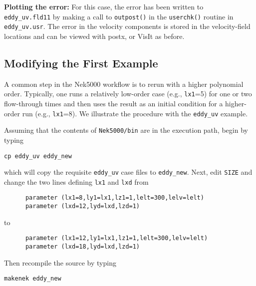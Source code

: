 {\bf Plotting the error:}
For this case, the error has been written to {\tt
eddy\_uv.fld11} by making a call to {\tt outpost()} in the {\tt userchk()}
routine in {\tt eddy\_uv.usr}.  The error in the velocity components
is stored in the velocity-field locations and can be viewed with 
postx, or VisIt as before.

\begin{comment}
through the following sequence: 
\begin{tabular}{r l l l}
  & {\bf click} \hspace*{1in} &{\bf type} \hspace*{1in} & {\bf comment} \\ \hline
1.& SET TIME         & 11 & load fld11 \\
2.& SET QUANTITY \\
3.& VELOCITY \\
4.& MAGNITUDE \\
5.& PLOT  \\
\end{tabular}
\end{comment}

\subsection{Modifying the First Example}

A common step in the Nek5000 workflow is to rerun with a higher
polynomial order.   Typically, one runs a relatively low-order case
(e.g., {\tt lx1}=5) for one or two flow-through times and then uses
the result as an initial condition for a higher-order run
(e.g., {\tt lx1}=8).  We illustrate the procedure with the 
{\tt eddy\_uv} example.

Assuming that the contents of {\tt Nek5000/bin}
are in the execution path, begin by typing
\begin{verbatim}
cp eddy_uv eddy_new
\end{verbatim}
which will copy the requisite {\tt eddy\_uv} case files
to {\tt eddy\_new}.  
Next, edit {\tt SIZE} and change the two lines defining
{\tt lx1} and {\tt lxd} from
\begin{verbatim}
      parameter (lx1=8,ly1=lx1,lz1=1,lelt=300,lelv=lelt)
      parameter (lxd=12,lyd=lxd,lzd=1)
\end{verbatim}
to
\begin{verbatim}
      parameter (lx1=12,ly1=lx1,lz1=1,lelt=300,lelv=lelt)
      parameter (lxd=18,lyd=lxd,lzd=1)
\end{verbatim}
Then recompile the source by typing
\begin{verbatim}
makenek eddy_new
\end{verbatim}

